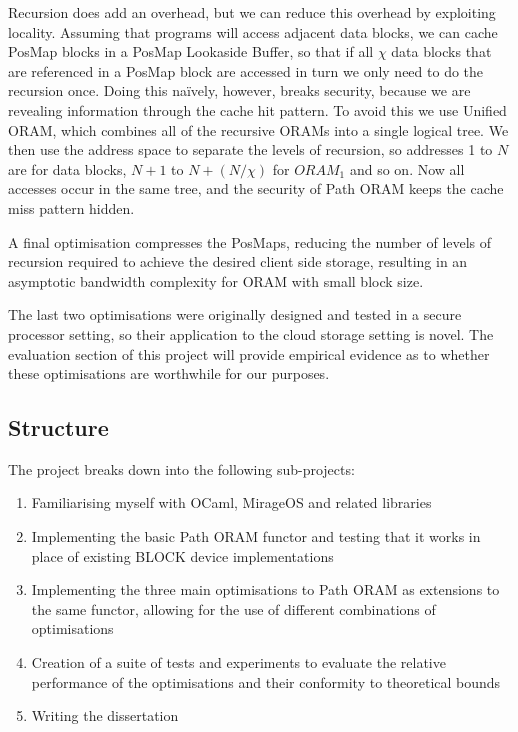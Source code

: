 \documentclass[12pt,a4paper,twoside]{article}
\begin{document}
Recursion does add an overhead, but we can reduce this overhead by exploiting locality. Assuming that programs will access adjacent data blocks, we can cache PosMap blocks in a PosMap Lookaside Buffer, so that if all $\chi$ data blocks that are referenced in a PosMap block are accessed in turn we only need to do the recursion once. Doing this na\"ively, however, breaks security, because we are revealing information through the cache hit pattern. To avoid this we use Unified ORAM, which combines all of the recursive ORAMs into a single logical tree. We then use the address space to separate the levels of recursion, so addresses 1 to $N$ are for data blocks, $N + 1$ to $N + (N / \chi)$ for $ORAM_1$ and so on. Now all accesses occur in the same tree, and the security of Path ORAM keeps the cache miss pattern hidden.

A final optimisation compresses the PosMaps, reducing the number of levels of recursion required to achieve the desired client side storage, resulting in an asymptotic bandwidth complexity for ORAM with small block size.

The last two optimisations were originally designed and tested in a secure processor setting, so their application to the cloud storage setting is novel. The evaluation section of this project will provide empirical evidence as to whether these optimisations are worthwhile for our purposes.

\subsection*{Structure}

The project breaks down into the following sub-projects:

\begin{enumerate}

\item Familiarising myself with OCaml, MirageOS and related libraries

\item Implementing the basic Path ORAM functor and testing that it works in place of existing BLOCK device implementations

\item Implementing the three main optimisations to Path ORAM as extensions to the same functor, allowing for the use of different combinations of optimisations

\item Creation of a suite of tests and experiments to evaluate the relative performance of the optimisations and their conformity to theoretical bounds

\item Writing the dissertation

\end{enumerate}
\end{document}
